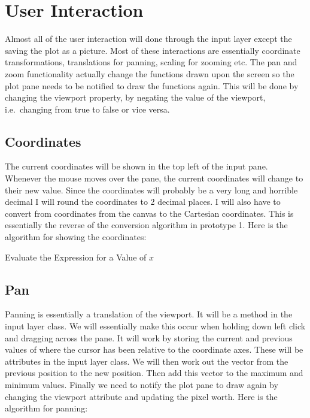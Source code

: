 \documentclass[../../../../main.tex]{subfiles}
\begin{document}
\section{User Interaction}
Almost all of the user interaction will done through the input layer except the saving the plot as a picture. Most of these interactions are essentially coordinate transformations, translations for panning, scaling for zooming etc. The pan and zoom functionality actually change the functions drawn upon the screen so the plot pane needs to be notified to draw the functions again. This will be done by changing the viewport property, by negating the value of the viewport, i.e.\ changing from true to false or vice versa.

\subsection{Coordinates}
The current coordinates will be shown in the top left of the input pane. Whenever the mouse moves over the pane, the current coordinates will change to their new value. Since the coordinates will probably be a very long and horrible decimal I will round the coordinates to 2 decimal places. I will also have to convert from coordinates from the canvas to the Cartesian coordinates. This is essentially the reverse of the conversion algorithm in prototype 1.  Here is the algorithm for showing the coordinates:
\begin{algorithm}[H]
\DontPrintSemicolon
\caption{Evaluate the Expression for a Value of $x$}
\end{algorithm}
\subsection{Pan}
Panning is essentially a translation of the viewport. It will be a method in the input layer class. We will essentially make this occur when holding down left click and dragging across the pane. It will work by storing the current and previous values of where the cursor has been relative to the coordinate axes. These will be attributes in the input layer class. We will then work out the vector from the previous position to the new position. Then add this vector to the maximum and minimum values. Finally we need to notify the plot pane to draw again by changing the viewport attribute and updating the pixel worth.
Here is the algorithm for panning:
\end{document}

